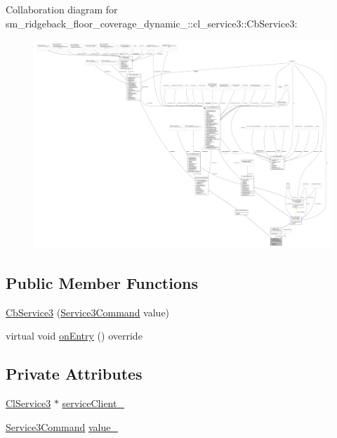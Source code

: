 Collaboration diagram for sm\+\_\+ridgeback\+\_\+floor\+\_\+coverage\+\_\+dynamic\+\_\+:\+:cl\+\_\+service3\+:\+:Cb\+Service3\+:
\nopagebreak
\begin{figure}[H]
\begin{center}
\leavevmode
\includegraphics[width=350pt]{classsm__ridgeback__floor__coverage__dynamic__1_1_1cl__service3_1_1CbService3__coll__graph}
\end{center}
\end{figure}
\subsection*{Public Member Functions}
\begin{DoxyCompactItemize}
\item 
\hyperlink{classsm__ridgeback__floor__coverage__dynamic__1_1_1cl__service3_1_1CbService3_a6b9bf2e5fa733fe3e1f5e9df7cf5bc94}{Cb\+Service3} (\hyperlink{namespacesm__ridgeback__floor__coverage__dynamic__1_1_1cl__service3_a44063f74ff3bc29b2e2e09b19416e604}{Service3\+Command} value)
\item 
virtual void \hyperlink{classsm__ridgeback__floor__coverage__dynamic__1_1_1cl__service3_1_1CbService3_a2bea1cd5cff40e33307b0858ea9baf0b}{on\+Entry} () override
\end{DoxyCompactItemize}
\subsection*{Private Attributes}
\begin{DoxyCompactItemize}
\item 
\hyperlink{classsm__ridgeback__floor__coverage__dynamic__1_1_1cl__service3_1_1ClService3}{Cl\+Service3} $\ast$ \hyperlink{classsm__ridgeback__floor__coverage__dynamic__1_1_1cl__service3_1_1CbService3_a8a2cee6224cca7b09ac79499062ef782}{service\+Client\+\_\+}
\item 
\hyperlink{namespacesm__ridgeback__floor__coverage__dynamic__1_1_1cl__service3_a44063f74ff3bc29b2e2e09b19416e604}{Service3\+Command} \hyperlink{classsm__ridgeback__floor__coverage__dynamic__1_1_1cl__service3_1_1CbService3_a2ef778d30aaafb2171697f39a1d42402}{value\+\_\+}
\end{DoxyCompactItemize}
